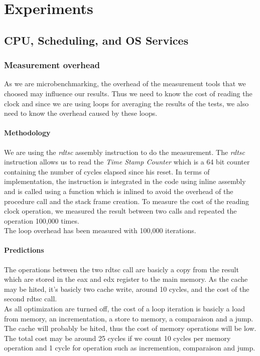 \section{Experiments}

\subsection{CPU, Scheduling, and OS Services}

\subsubsection{Measurement overhead}

As we are microbenchmarking, the overhead of the measurement tools that we
choosed may influence our results. Thus we need to know the cost of reading
the clock and since we are using loops for averaging the results of the tests, we
also need to know the overhead caused by these loops.

\paragraph{Methodology}
We are using the \emph{rdtsc} assembly instruction to do the measurement.
The \emph{rdtsc} instruction allows us to read the \emph{Time Stamp Counter}
which is a 64 bit counter containing the number of cycles elapsed since his
reset.
In terms of implementation, the instruction is integrated in the code using
inline assembly and is called using a function which is inlined to avoid the
overhead of the procedure call and the stack frame creation.
To measure the cost of the reading clock operation, we measured the result between
two calls and repeated the operation 100,000 times.\\

The loop overhead has been measured with 100,000 iterations.

\paragraph{Predictions}
The operations between the two rdtsc call are basicly a copy from the result
which are stored in the eax and edx register to the main memory.
As the cache may be hited, it's basicly two cache write, around 10 cycles, and
the cost of the second rdtsc call.\\

As all optimization are turned off, the cost of a loop iteration is basicly a
load from memory, an incrementation, a store to memory, a comparaison and a
jump.
The cache will probably be hited, thus the cost of memory operations will be low.
The total cost may be around 25 cycles if we count 10 cycles per memory
operation and 1 cycle for operation such as incremention, comparaison and
jump.\\

